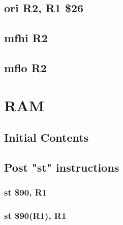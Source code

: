 \documentclass{article}
\begin{document}
    \subsection{ori R2, R1 \$26} \label{ori_sequence}
        
    \subsection{mfhi R2} \label{mfhi_sequence}
        
    \subsection{mflo R2} \label{mflo_sequence}
        
\section{RAM}
    \subsection{Initial Contents} \label{ram_init}
    \subsection{Post "st" instructions}
        \subsubsection{st \$90, R1} \label{ram_st_case_1}
            
        \subsubsection{st \$90(R1), R1} \label{ram_st_case_2}
            
\end{document}

